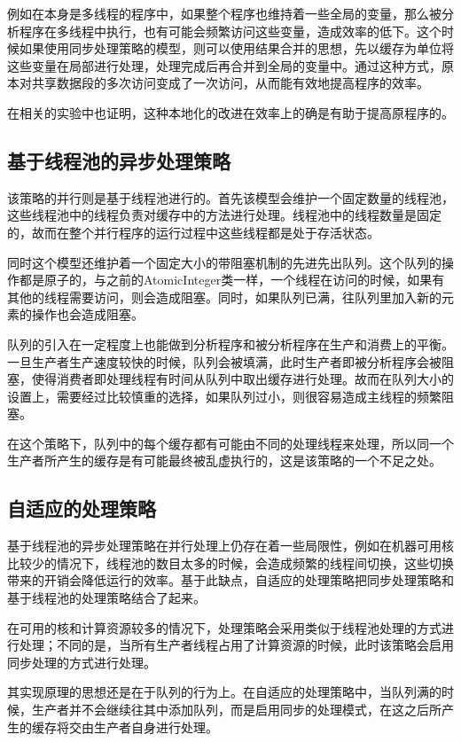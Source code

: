 例如在本身是多线程的程序中，如果整个程序也维持着一些全局的变量，那么被分析程序在多线程中执行，也有可能会频繁访问这些变量，造成效率的低下。这个时候如果使用同步处理策略的模型，则可以使用结果合并的思想，先以缓存为单位将这些变量在局部进行处理，处理完成后再合并到全局的变量中。通过这种方式，原本对共享数据段的多次访问变成了一次访问，从而能有效地提高程序的效率。

在相关的实验中也证明，这种本地化的改进在效率上的确是有助于提高原程序的。

\subsection{基于线程池的异步处理策略}

该策略的并行则是基于线程池进行的。首先该模型会维护一个固定数量的线程池，这些线程池中的线程负责对缓存中的方法进行处理。线程池中的线程数量是固定的，故而在整个并行程序的运行过程中这些线程都是处于存活状态。

同时这个模型还维护着一个固定大小的带阻塞机制的先进先出队列。这个队列的操作都是原子的，与之前的AtomicInteger类一样，一个线程在访问的时候，如果有其他的线程需要访问，则会造成阻塞。同时，如果队列已满，往队列里加入新的元素的操作也会造成阻塞。

队列的引入在一定程度上也能做到分析程序和被分析程序在生产和消费上的平衡。一旦生产者生产速度较快的时候，队列会被填满，此时生产者即被分析程序会被阻塞，使得消费者即处理线程有时间从队列中取出缓存进行处理。故而在队列大小的设置上，需要经过比较慎重的选择，如果队列过小，则很容易造成主线程的频繁阻塞。

在这个策略下，队列中的每个缓存都有可能由不同的处理线程来处理，所以同一个生产者所产生的缓存是有可能最终被乱虚执行的，这是该策略的一个不足之处。

\subsection{自适应的处理策略}

基于线程池的异步处理策略在并行处理上仍存在着一些局限性，例如在机器可用核比较少的情况下，线程池的数目太多的时候，会造成频繁的线程间切换，这些切换带来的开销会降低运行的效率。基于此缺点，自适应的处理策略把同步处理策略和基于线程池的处理策略结合了起来。

在可用的核和计算资源较多的情况下，处理策略会采用类似于线程池处理的方式进行处理；不同的是，当所有生产者线程占用了计算资源的时候，此时该策略会启用同步处理的方式进行处理。

其实现原理的思想还是在于队列的行为上。在自适应的处理策略中，当队列满的时候，生产者并不会继续往其中添加队列，而是启用同步的处理模式，在这之后所产生的缓存将交由生产者自身进行处理。

